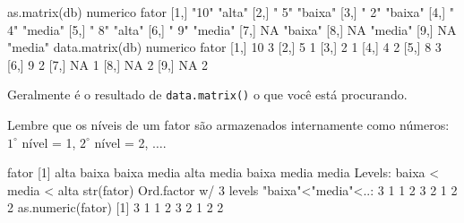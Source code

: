 \documentclass[
  10pt,
  a4paper]{book}
\newenvironment{Shaded}{\begin{snugshade}}{\end{snugshade}}
\newcommand{\ConstantTok}[1]{\textcolor[rgb]{0.00,0.00,0.00}{#1}}
\newcommand{\DecValTok}[1]{\textcolor[rgb]{0.00,0.00,0.81}{#1}}
\newcommand{\FunctionTok}[1]{\textcolor[rgb]{0.00,0.00,0.00}{#1}}
\newcommand{\NormalTok}[1]{#1}
\newcommand{\SpecialCharTok}[1]{\textcolor[rgb]{0.00,0.00,0.00}{#1}}
\newcommand{\StringTok}[1]{\textcolor[rgb]{0.31,0.60,0.02}{#1}}
\begin{document}
\begin{Shaded}
\begin{Highlighting}[]
\FunctionTok{as.matrix}\NormalTok{(db)}
\NormalTok{      numerico fator  }
\NormalTok{ [}\DecValTok{1}\NormalTok{,] }\StringTok{"10"}     \StringTok{"alta"} 
\NormalTok{ [}\DecValTok{2}\NormalTok{,] }\StringTok{" 5"}     \StringTok{"baixa"}
\NormalTok{ [}\DecValTok{3}\NormalTok{,] }\StringTok{" 2"}     \StringTok{"baixa"}
\NormalTok{ [}\DecValTok{4}\NormalTok{,] }\StringTok{" 4"}     \StringTok{"media"}
\NormalTok{ [}\DecValTok{5}\NormalTok{,] }\StringTok{" 8"}     \StringTok{"alta"} 
\NormalTok{ [}\DecValTok{6}\NormalTok{,] }\StringTok{" 9"}     \StringTok{"media"}
\NormalTok{ [}\DecValTok{7}\NormalTok{,] }\ConstantTok{NA}       \StringTok{"baixa"}
\NormalTok{ [}\DecValTok{8}\NormalTok{,] }\ConstantTok{NA}       \StringTok{"media"}
\NormalTok{ [}\DecValTok{9}\NormalTok{,] }\ConstantTok{NA}       \StringTok{"media"}
\FunctionTok{data.matrix}\NormalTok{(db)}
\NormalTok{      numerico fator}
\NormalTok{ [}\DecValTok{1}\NormalTok{,]       }\DecValTok{10}     \DecValTok{3}
\NormalTok{ [}\DecValTok{2}\NormalTok{,]        }\DecValTok{5}     \DecValTok{1}
\NormalTok{ [}\DecValTok{3}\NormalTok{,]        }\DecValTok{2}     \DecValTok{1}
\NormalTok{ [}\DecValTok{4}\NormalTok{,]        }\DecValTok{4}     \DecValTok{2}
\NormalTok{ [}\DecValTok{5}\NormalTok{,]        }\DecValTok{8}     \DecValTok{3}
\NormalTok{ [}\DecValTok{6}\NormalTok{,]        }\DecValTok{9}     \DecValTok{2}
\NormalTok{ [}\DecValTok{7}\NormalTok{,]       }\ConstantTok{NA}     \DecValTok{1}
\NormalTok{ [}\DecValTok{8}\NormalTok{,]       }\ConstantTok{NA}     \DecValTok{2}
\NormalTok{ [}\DecValTok{9}\NormalTok{,]       }\ConstantTok{NA}     \DecValTok{2}
\end{Highlighting}
\end{Shaded}

Geralmente é o resultado de \texttt{data.matrix()} o que você está procurando.

Lembre que os níveis de um fator são armazenados internamente como
números: \(1^\circ\) nível = 1, \(2^\circ\) nível = 2, \(\ldots\).

\begin{Shaded}
\begin{Highlighting}[]
\NormalTok{fator}
\NormalTok{[}\DecValTok{1}\NormalTok{] alta  baixa baixa media alta  media baixa media media}
\NormalTok{Levels}\SpecialCharTok{:}\NormalTok{ baixa }\SpecialCharTok{\textless{}}\NormalTok{ media }\SpecialCharTok{\textless{}}\NormalTok{ alta}
\FunctionTok{str}\NormalTok{(fator)}
\NormalTok{ Ord.factor w}\SpecialCharTok{/} \DecValTok{3}\NormalTok{ levels }\StringTok{"baixa"}\SpecialCharTok{\textless{}}\StringTok{"media"}\SpecialCharTok{\textless{}}\NormalTok{..}\SpecialCharTok{:} \DecValTok{3} \DecValTok{1} \DecValTok{1} \DecValTok{2} \DecValTok{3} \DecValTok{2} \DecValTok{1} \DecValTok{2} \DecValTok{2}
\FunctionTok{as.numeric}\NormalTok{(fator)}
\NormalTok{[}\DecValTok{1}\NormalTok{] }\DecValTok{3} \DecValTok{1} \DecValTok{1} \DecValTok{2} \DecValTok{3} \DecValTok{2} \DecValTok{1} \DecValTok{2} \DecValTok{2}
\end{Highlighting}
\end{Shaded}
\end{document}
